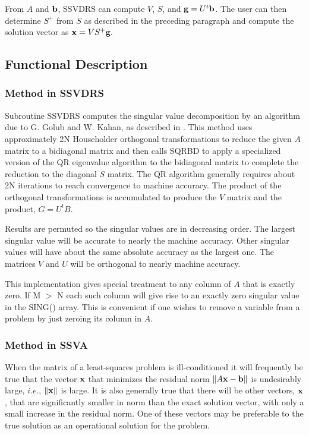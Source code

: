 \documentclass[twoside]{MATH77}
\begin{document}
From $A$ and ${\bf b}$, SSVDRS can compute $V$, $S$, and ${\bf g} = U^t{\bf b}$.
The user can then determine $S^+$ from $S$ as described in the preceding
paragraph and compute the solution vector as ${\bf x} = VS^+{\bf g}.$

\subsection{Functional Description}

\subsubsection{Method in SSVDRS}

Subroutine SSVDRS computes the singular value decomposition by an
algorithm due to G.  Golub and W.  Kahan, as described in
\cite{Lawson:1974:SLS}.  This method uses approximately 2N Householder
orthogonal transformations to reduce the given $A$ matrix to a bidiagonal
matrix and then calls SQRBD to apply a specialized version of the QR
eigenvalue algorithm to the bidiagonal matrix to complete the reduction to
the diagonal $S$ matrix.  The QR algorithm generally requires about 2N
iterations to reach convergence to machine accuracy.  The product of the
orthogonal transformations is accumulated to produce the $V$ matrix and
the product, $G = U^tB.$

Results are permuted so the singular values are in decreasing order.
The largest singular value will be accurate to nearly the machine accuracy.
Other singular values will have about the same absolute accuracy as the
largest one. The matrices $V$ and $U$ will be orthogonal to nearly machine
accuracy.

This implementation gives special treatment to any column of $A$ that is
exactly zero. If M $>$ N each such column will give rise to an exactly zero
singular value in the SING() array. This is convenient if one wishes to
remove a variable from a problem by just zeroing its column in $A$.

\subsubsection{Method in SSVA}

When the matrix of a least-squares problem is ill-conditioned it will
frequently be true that the vector ${\bf x}$ that minimizes the residual
norm $\|A{\bf x} - {\bf b}\|$ is undesirably large, $i.e.$, $\|{\bf x}\|$ is
large. It is also generally true that there will be other vectors, ${\bf x}$%
, that are significantly smaller in norm than the exact solution vector,
with only a small increase in the residual norm. One of these
vectors may be preferable to the true solution as an operational solution
for the problem.
\end{document}
